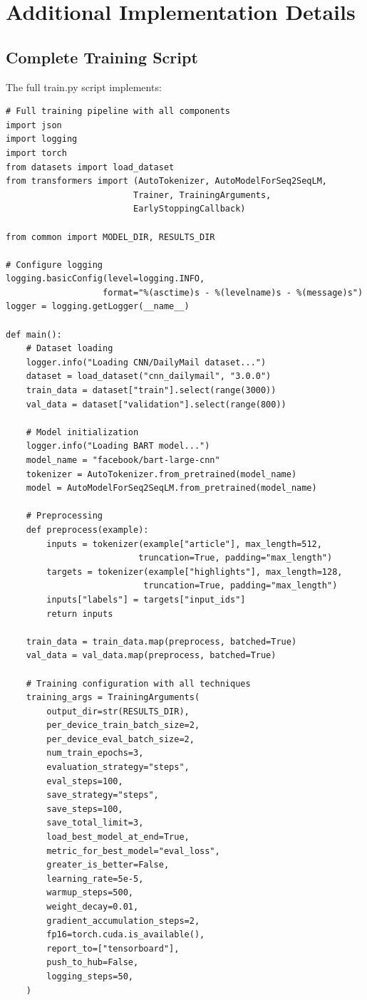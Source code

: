 \documentclass[12pt,a4paper,oneside]{report}
\begin{document}
\newpage

\appendix

\chapter{Additional Implementation Details}
\label{app:implementation}

\section{Complete Training Script}
The full train.py script implements:
\begin{lstlisting}
# Full training pipeline with all components
import json
import logging
import torch
from datasets import load_dataset
from transformers import (AutoTokenizer, AutoModelForSeq2SeqLM,
                         Trainer, TrainingArguments,
                         EarlyStoppingCallback)

from common import MODEL_DIR, RESULTS_DIR

# Configure logging
logging.basicConfig(level=logging.INFO,
                   format="%(asctime)s - %(levelname)s - %(message)s")
logger = logging.getLogger(__name__)

def main():
    # Dataset loading
    logger.info("Loading CNN/DailyMail dataset...")
    dataset = load_dataset("cnn_dailymail", "3.0.0")
    train_data = dataset["train"].select(range(3000))
    val_data = dataset["validation"].select(range(800))
    
    # Model initialization
    logger.info("Loading BART model...")
    model_name = "facebook/bart-large-cnn"
    tokenizer = AutoTokenizer.from_pretrained(model_name)
    model = AutoModelForSeq2SeqLM.from_pretrained(model_name)
    
    # Preprocessing
    def preprocess(example):
        inputs = tokenizer(example["article"], max_length=512,
                          truncation=True, padding="max_length")
        targets = tokenizer(example["highlights"], max_length=128,
                           truncation=True, padding="max_length")
        inputs["labels"] = targets["input_ids"]
        return inputs
    
    train_data = train_data.map(preprocess, batched=True)
    val_data = val_data.map(preprocess, batched=True)
    
    # Training configuration with all techniques
    training_args = TrainingArguments(
        output_dir=str(RESULTS_DIR),
        per_device_train_batch_size=2,
        per_device_eval_batch_size=2,
        num_train_epochs=3,
        evaluation_strategy="steps",
        eval_steps=100,
        save_strategy="steps",
        save_steps=100,
        save_total_limit=3,
        load_best_model_at_end=True,
        metric_for_best_model="eval_loss",
        greater_is_better=False,
        learning_rate=5e-5,
        warmup_steps=500,
        weight_decay=0.01,
        gradient_accumulation_steps=2,
        fp16=torch.cuda.is_available(),
        report_to=["tensorboard"],
        push_to_hub=False,
        logging_steps=50,
    )
    

\end{lstlisting}
\end{document}
